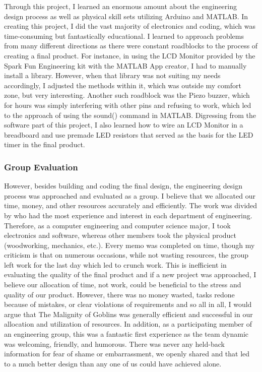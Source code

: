 \documentclass[conference]{IEEEtran}
\begin{document}
\par Through this project, I learned an enormous amount about the engineering design process as well as physical skill sets utilizing Arduino and MATLAB. In creating this project, I did the vast majority of electronics and coding, which was time-consuming but fantastically educational. I learned to approach problems from many different directions as there were constant roadblocks to the process of creating a final product. For instance, in using the LCD Monitor provided by the Spark Fun Engineering kit with the MATLAB App creator, I had to manually install a library. However, when that library was not suiting my needs accordingly, I adjusted the methods within it, which was outside my comfort zone, but very interesting. Another such roadblock was the Piezo buzzer, which for hours was simply interfering with other pins and refusing to work, which led to the approach of using the sound() command in MATLAB. Digressing from the software part of this project, I also learned how to wire an LCD Monitor in a breadboard and use premade LED resistors that served as the basis for the LED timer in the final product.   

\subsubsection{Group Evaluation}

\par However, besides building and coding the final design, the engineering design process was approached and evaluated as a group. I believe that we allocated our time, money, and other resources accurately and efficiently. The work was divided by who had the most experience and interest in each department of engineering. Therefore, as a computer engineering and computer science major, I took electronics and software, whereas other members took the physical product (woodworking, mechanics, etc.). Every memo was completed on time, though my criticism is that on numerous occasions, while not wasting resources, the group left work for the last day which led to crunch work. This is inefficient in evaluating the quality of the final product and if a new project was approached, I believe our allocation of time, not work, could be beneficial to the stress and quality of our product. However, there was no money wasted, tasks redone because of mistakes, or clear violations of requirements and so all in all, I would argue that The Malignity of Goblins was generally efficient and successful in our allocation and utilization of resources. In addition, as a participating member of an engineering group, this was a fantastic first experience as the team dynamic was welcoming, friendly, and humorous. There was never any held-back information for fear of shame or embarrassment, we openly shared and that led to a much better design than any one of us could have achieved alone. 
\end{document}
